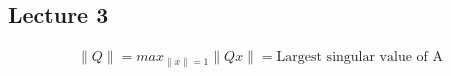 \documentclass[../main.tex]{subfiles}
\begin{document}
\subsection{Lecture 3}

\begin{definition}
    \begin{align*}
        \|Q\|=max_{\|x\|=1}\|Qx\|= \text{Largest singular value of A}
    \end{align*}
\end{definition}
\end{document}
